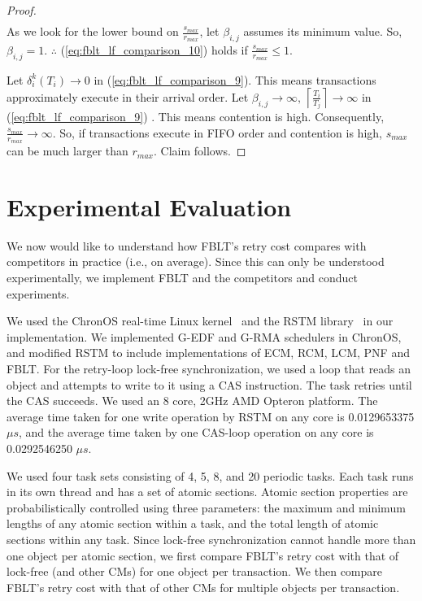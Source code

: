 \documentclass[prodmode,acmtecs]{acmsmall}
\begin{document}
\begin{compactenum}
\begin{proof}
\begin{eqnarray}
\end{eqnarray}
As we look for the lower bound on $\frac{s_{max}}{r_{max}}$, let
$\beta_{i,j}$ assumes its minimum value. So, $\beta_{i,j}=1$. $\therefore$
(\ref{eq:fblt_lf_comparison_10}) holds if $\frac{s_{max}}{r_{max}}\le1$.

Let $\delta_{i}^{k}(T_{i})\rightarrow0$ in (\ref{eq:fblt_lf_comparison_9}).
This means transactions approximately execute in their arrival order.
Let $\beta_{i,j}\rightarrow\infty,\,\left\lceil \frac{T_{i}}{T_{j}}\right\rceil \rightarrow\infty$
in (\ref{eq:fblt_lf_comparison_9}) . This means contention is high.
Consequently, $\frac{s_{max}}{r_{max}}\rightarrow\infty$. So, if
transactions execute in FIFO order and contention is high, $s_{max}$
can be much larger than $r_{max}$. Claim follows.

\end{proof}

\section{Experimental Evaluation}\label{exp_eval}

We now would like to understand how FBLT's retry cost compares with competitors in practice (i.e., on average). Since this can only be understood experimentally, we implement FBLT and the competitors and conduct experiments. 


We used the ChronOS real-time Linux kernel~\cite{dellinger2011chronos}
and the RSTM library~\cite{marathe2006lowering} in our implementation. We implemented G-EDF and G-RMA schedulers in ChronOS, and modified RSTM to include implementations of ECM, RCM, LCM, PNF and FBLT. For the retry-loop lock-free synchronization, we used a loop that reads an object and attempts to write to it  using a CAS  instruction. The task retries until the CAS succeeds. We used an 8 core, 2GHz AMD Opteron platform. The average time taken for one write operation by RSTM on any core is 0.0129653375$\mu s$, and the average time taken by one CAS-loop operation on any core is 0.0292546250 $\mu s$.

We used four task sets consisting of 4, 5, 8, and 20 periodic tasks. Each task runs in its own thread and has a set of atomic sections. Atomic section properties are probabilistically controlled using three parameters: the maximum and minimum lengths of any atomic section within a task, and the total length of atomic sections within any task. Since lock-free synchronization cannot handle more than one object per atomic section, we first compare FBLT's retry cost with that of lock-free (and other CMs) for one object per transaction. We then compare FBLT's retry cost with that of other CMs for multiple objects per transaction.



\end{compactenum}
\end{document}
